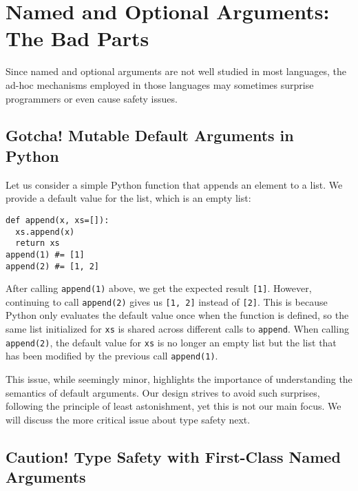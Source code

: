 \section{Named and Optional Arguments: The Bad Parts} \label{sec:bad}

Since named and optional arguments are not well studied in most languages, the
ad-hoc mechanisms employed in those languages may sometimes surprise programmers
or even cause safety issues.

\subsection{Gotcha! Mutable Default Arguments in Python} \label{sec:mut}

Let us consider a simple Python function that appends an element to a list. We
provide a default value for the list, which is an empty list:

\begin{multicols}{2}
\begin{lstlisting}[language={[3]Python}]
def append(x, xs=[]):
  xs.append(x)
  return xs
append(1) #= [1]
append(2) #= [1, 2]
\end{lstlisting}
\end{multicols}

\noindent
After calling \lstinline{append(1)} above, we get the expected result
\lstinline{[1]}. However, continuing to call \lstinline{append(2)} gives us
\lstinline{[1, 2]} instead of \lstinline{[2]}. This is because Python only
evaluates the default value once when the function is defined, so the same list
initialized for \lstinline{xs} is shared across different calls to
\lstinline{append}. When calling \lstinline{append(2)}, the default value for
\lstinline{xs} is no longer an empty list but the list that has been modified by
the previous call \lstinline{append(1)}.

This issue, while seemingly minor, highlights the importance of understanding
the semantics of default arguments. Our design strives to avoid such surprises,
following the principle of least astonishment, yet this is not our main focus.
We will discuss the more critical issue about type safety next.

\subsection{Caution! Type Safety with First-Class Named Arguments} \label{sec:mypy}

